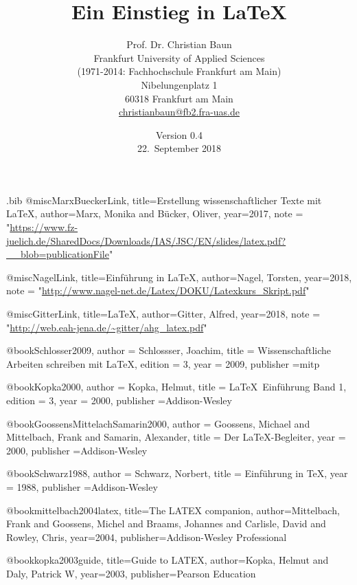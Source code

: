 \documentclass[a4paper,10pt,twoside]{scrbook}
\begin{document}
\begin{filecontents*}{\jobname.bib}
@misc{MarxBueckerLink,
	title={{Erstellung wissenschaftlicher Texte mit \LaTeX}},
	author={Marx, Monika and Bücker, Oliver},
	year={2017},
	note = "\url{https://www.fz-juelich.de/SharedDocs/Downloads/IAS/JSC/EN/slides/latex.pdf?__blob=publicationFile}"
}
   
@misc{NagelLink,
   	title={{Einführung in \LaTeX}},
   	author={Nagel, Torsten},
   	year={2018},
   	note = "\url{http://www.nagel-net.de/Latex/DOKU/Latexkurs_Skript.pdf}"
}

@misc{GitterLink,
	title={{\LaTeX}},
	author={Gitter, Alfred},
	year={2018},
	note = "\url{http://web.eah-jena.de/~gitter/ahg_latex.pdf}"
}

@book{Schlosser2009,
	author = {Schlossser, Joachim},
	title = {{Wissenschaftliche Arbeiten schreiben mit \LaTeX}},
	edition = {3},
	year = {2009},
	publisher ={mitp}
}


@book{Kopka2000,
	author = {Kopka, Helmut},
	title = {{\LaTeX\ Einführung Band 1}},
	edition = {3},
	year = {2000},
	publisher ={Addison-Wesley}
}


@book{GoossensMittelachSamarin2000,
	author = {Goossens, Michael and Mittelbach, Frank and Samarin, Alexander},
	title = {{Der \LaTeX-Begleiter}},
	year = {2000},
	publisher ={Addison-Wesley}
}


@book{Schwarz1988,
	author = {Schwarz, Norbert},
	title = {{Einführung in \TeX}},
	year = {1988},
    publisher ={Addison-Wesley}
}
  
@book{mittelbach2004latex,
	title={The LATEX companion},
	author={Mittelbach, Frank and Goossens, Michel and Braams, Johannes and Carlisle, David and Rowley, Chris},
	year={2004},
	publisher={Addison-Wesley Professional}
}

@book{kopka2003guide,
	title={Guide to LATEX},
	author={Kopka, Helmut and Daly, Patrick W},
	year={2003},
	publisher={Pearson Education}
}

\end{filecontents*}

\renewcommand{\arraystretch}{1}

\title{Ein Einstieg in \LaTeX}
\author{Prof. Dr. Christian Baun\\ Frankfurt University of Applied Sciences \\ (1971-2014: Fachhochschule Frankfurt am Main)\\
Nibelungenplatz 1 \\ 60318 Frankfurt am Main\\\url{christianbaun@fb2.fra-uas.de}\\[3em]}
\date{Version 0.4\\[3em] 22.~September 2018}
\end{document}
